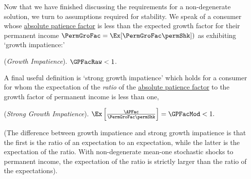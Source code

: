 \documentclass[BufferStockTheory]{subfiles}
\begin{document}
Now that we have finished discussing the requirements for a non-degenerate solution, we turn to assumptions required for stability.
We speak of a consumer whose \hyperlink{APFac}{absolute patience factor} is less than the expected growth factor for their permanent income $\PermGroFac = \Ex[\PermGroFac \permShk])$ as exhibiting `growth impatience:' 
\hypertarget{GPFacRawDefn}{}
\hypertarget{GICRaw}{}
\begin{assumS}\label{ass:GICRaw} (\textit{Growth Impatience}).
$ \GPFacRaw  < 1$.
\end{assumS}

\begin{comment}
\begin{verbatimwrite}{\EqDir/GICRaw}
  \begin{equation}\begin{gathered}\begin{aligned}
        \text{\GICRaw:~~}  &&  \GPFacRaw  < 1 . \phantom{/\PermGroFac}&  \phantom{\text{\GICRaw:~~}} \label{eq:GICRaw}
      \end{aligned}\end{gathered}\end{equation}
\end{verbatimwrite}\unskip

\end{assumS}
\end{comment}

A final useful definition is `strong growth impatience' which holds for a consumer for whom the expectation of the \textit{ratio} of the \hyperlink{APFac}{absolute patience factor} to the growth factor of permanent income is less than one, 
\hypertarget{GICMod}{}
\begin{assumS}(\textit{Strong Growth Impatience}). \label{ass:GICMod}
$ \Ex\left[\frac{\APFac}{\PermGroFac \permShk}\right] = \GPFacMod  < 1.$
\end{assumS}

(The difference between growth impatience and strong growth impatience is that the first is the ratio of an expectation to an expectation, while the latter is the expectation of the ratio.
With non-degenerate mean-one stochastic shocks to permanent income, the expectation of the ratio is strictly larger than the ratio of the expectations).

\begin{comment}
\begin{verbatimwrite}{\EqDir/GICMod}
  \begin{align}
    \text{{\GICMod}:~~}    \GPFacMod  & < 1 .  \phantom{\text{{\GICMod}:~~}}\label{eq:GICMod}
  \end{align}\end{verbatimwrite} \unskip

\end{comment}
\end{document}
